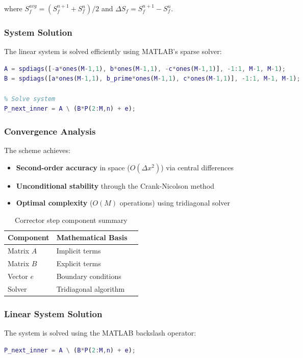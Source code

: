 \documentclass{article}
\begin{document}
where $S_f^{avg} = (S_f^{n+1} + S_f^n)/2$ and $\Delta S_f = S_f^{n+1} - S_f^n$.
\subsubsection{System Solution}
The linear system is solved efficiently using MATLAB's sparse solver:

\begin{lstlisting}[language=Matlab,caption={Linear system solution}]
% Construct tridiagonal matrices
A = spdiags([-a*ones(M-1,1), b*ones(M-1,1), -c*ones(M-1,1)], -1:1, M-1, M-1);
B = spdiags([a*ones(M-1,1), b_prime*ones(M-1,1), c*ones(M-1,1)], -1:1, M-1, M-1);

% Solve system
P_next_inner = A \ (B*P(2:M,n) + e);
\end{lstlisting}

\subsubsection{Convergence Analysis}
The scheme achieves:
\begin{itemize}
\item \textbf{Second-order accuracy} in space ($O(\Delta x^2)$) via central differences
\item \textbf{Unconditional stability} through the Crank-Nicolson method
\item \textbf{Optimal complexity} ($O(M)$ operations) using tridiagonal solver
\end{itemize}

\begin{table}[h]
\centering
\caption{Corrector step component summary}
\begin{tabular}{lll}
\hline
Component & Mathematical Basis \\ \hline
Matrix $A$ & Implicit terms  \\
Matrix $B$ & Explicit terms \\
Vector $e$ & Boundary conditions  \\
Solver & Tridiagonal algorithm \\ \hline
\end{tabular}
\end{table}
\subsubsection{Linear System Solution}
The system is solved using the MATLAB backslash operator:

\begin{lstlisting}[language=Matlab,caption={System solution}]
P_next_inner = A \ (B*P(2:M,n) + e);  
\end{lstlisting}
\end{document}

